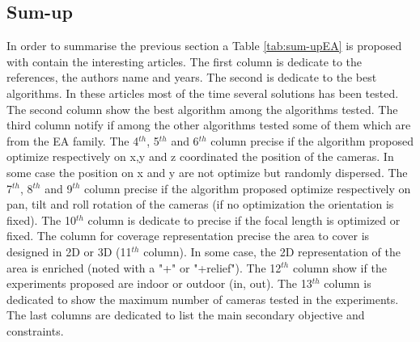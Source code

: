  \subsection{Sum-up} 
 In order to summarise the previous section a Table \ref{tab:sum-upEA} is proposed with contain the interesting articles.
 The first column  is dedicate to the references, the authors name  and years.
  The second is dedicate to  the best algorithms. In these articles most of the time several solutions has been tested. The second column show the best algorithm among the algorithms tested. The third column notify if among the other algorithms tested some of them which are from the EA  family. The 4$^{th}$,  5$^{th}$ and 6$^{th}$ column precise if the algorithm proposed optimize respectively on x,y and z coordinated the position of the cameras. In some case the position on x and y are not optimize  but randomly dispersed. The 7$^{th}$,  8$^{th}$ and 9$^{th}$ column precise if the algorithm proposed optimize respectively on pan, tilt and roll rotation of the cameras (if no optimization the orientation is fixed). The 10$^{th}$ column is dedicate to precise if the focal length is optimized or fixed. The column for coverage representation  precise the area to cover is designed in  2D or 3D (11$^{th}$ column). In some case, the 2D representation of the area is enriched (noted with a "+" or "+relief"). The 12$^{th}$  column show if the experiments proposed are indoor or outdoor (in, out). The 13$^{th}$  column is dedicated to show the maximum number of cameras tested in the experiments.  
 The last columns are  dedicated to list the main secondary objective and constraints. 
  
 
 
